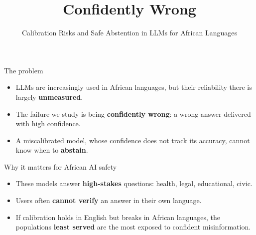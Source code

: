 \documentclass[aspectratio=169,11pt]{beamer}
\title{Confidently Wrong}
\author{Calibration Risks and Safe Abstention in LLMs for African Languages}
\newcommand{\teamflags}[1][1]{%
\begin{tikzpicture}[scale=#1, every node/.style={scale=#1}]
  \begin{scope}[shift={(0,0)}]
    \fill[ethgreen]  (0,1.0667) rectangle (2.4,1.6);
    \fill[ethyellow] (0,0.5333) rectangle (2.4,1.0667);
    \fill[ethred]    (0,0)      rectangle (2.4,0.5333);
    \fill[ethblue] (1.2,0.8) circle (0.46);
    \node[star, star points=5, star point ratio=2.3, fill=ethyellow,
          draw=ethyellow, minimum size=7.5mm, inner sep=0pt] at (1.2,0.8) {};
    \draw[black,line width=0.4pt] (0,0) rectangle (2.4,1.6);
    \node[font=\scriptsize] at (1.2,-0.35) {Ethiopia};
  \end{scope}
  \begin{scope}[shift={(3.6,0)}]
    \fill[white]   (0,0)   rectangle (2.4,1.6);
    \fill[nggreen] (0,0)   rectangle (0.8,1.6);
    \fill[nggreen] (1.6,0) rectangle (2.4,1.6);
    \draw[black,line width=0.4pt] (0,0) rectangle (2.4,1.6);
    \node[font=\scriptsize] at (1.2,-0.35) {Nigeria};
  \end{scope}
  \begin{scope}[shift={(7.2,0)}]
    \fill[black]   (0,1.12) rectangle (2.4,1.6);
    \fill[white]   (0,1.04) rectangle (2.4,1.12);
    \fill[kered]   (0,0.56) rectangle (2.4,1.04);
    \fill[white]   (0,0.48) rectangle (2.4,0.56);
    \fill[kegreen] (0,0)    rectangle (2.4,0.48);
    \draw[white,line width=1.3pt] (0.98,0.25) -- (1.42,1.35);
    \draw[white,line width=1.3pt] (1.42,0.25) -- (0.98,1.35);
    \fill[kered] (1.2,0.8) ellipse (0.2 and 0.42);
    \draw[white,line width=0.9pt] (1.2,0.8) ellipse (0.2 and 0.42);
    \fill[white] (1.08,0.77) rectangle (1.32,0.83);
    \draw[black,line width=0.4pt] (0,0) rectangle (2.4,1.6);
    \node[font=\scriptsize] at (1.2,-0.35) {Kenya};
  \end{scope}
\end{tikzpicture}}
\begin{document}

\begin{frame}{The problem}
  \begin{itemize}
    \item LLMs are increasingly used in African languages, but their reliability there is largely \textbf{unmeasured}.
    \item The failure we study is being \textbf{confidently wrong}: a wrong answer delivered with high confidence.
    \item A miscalibrated model, whose confidence does not track its accuracy, cannot know when to \textbf{abstain}.
  \end{itemize}
\end{frame}

\begin{frame}{Why it matters for African AI safety}
  \begin{itemize}
    \item These models answer \textbf{high-stakes} questions: health, legal, educational, civic.
    \item Users often \textbf{cannot verify} an answer in their own language.
    \item If calibration holds in English but breaks in African languages, the populations \textbf{least served} are the most exposed to confident misinformation.
  \end{itemize}
\end{frame}
\end{document}
